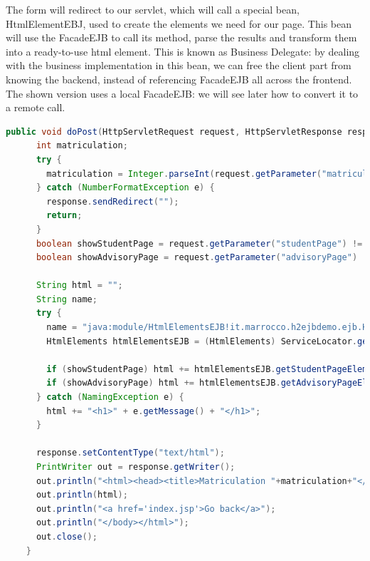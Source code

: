 \documentclass[12pt, a4paper]{article}
\begin{document}
  The form will redirect to our servlet, which will call a special bean, HtmlElementEBJ, used to create the elements we need for our page. This bean will use the FacadeEJB to call its method, parse the results and transform them into a ready-to-use html element. This is known as Business Delegate: by dealing with the business implementation in this bean, we can free the client part from knowing the backend, instead of referencing FacadeEJB all across the frontend. The shown version uses a local FacadeEJB: we will see later how to convert it to a remote call.

  \begin{lstlisting}[language=java, caption={Servlet doPost}]
    public void doPost(HttpServletRequest request, HttpServletResponse response) throws IOException {
      int matriculation;
      try {
        matriculation = Integer.parseInt(request.getParameter("matriculation"));
      } catch (NumberFormatException e) {
        response.sendRedirect("");
        return;
      }
      boolean showStudentPage = request.getParameter("studentPage") != null;
      boolean showAdvisoryPage = request.getParameter("advisoryPage") != null;

      String html = "";
      String name;
      try {
        name = "java:module/HtmlElementsEJB!it.marrocco.h2ejbdemo.ejb.HtmlElements";
        HtmlElements htmlElementsEJB = (HtmlElements) ServiceLocator.getService(name);

        if (showStudentPage) html += htmlElementsEJB.getStudentPageElement(matriculation);
        if (showAdvisoryPage) html += htmlElementsEJB.getAdvisoryPageElement(matriculation);
      } catch (NamingException e) {
        html += "<h1>" + e.getMessage() + "</h1>";
      }

      response.setContentType("text/html");
      PrintWriter out = response.getWriter();
      out.println("<html><head><title>Matriculation "+matriculation+"</title></head><body>");
      out.println(html);
      out.println("<a href='index.jsp'>Go back</a>");
      out.println("</body></html>");
      out.close();
    }
  \end{lstlisting}
\end{document}
